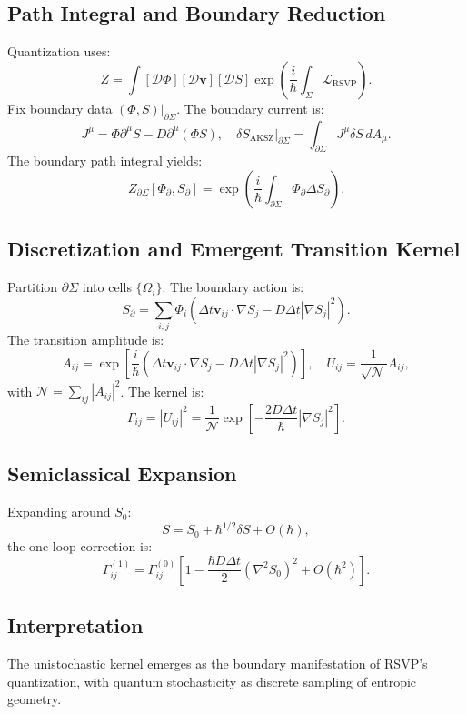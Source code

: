 \documentclass[12pt]{article}
\begin{document}
\subsection{Path Integral and Boundary Reduction}

Quantization uses:
\[
Z = \int [\mathcal{D}\Phi][\mathcal{D}\mathbf{v}][\mathcal{D}S] \exp\left( \frac{i}{\hbar} \int_\Sigma \mathcal{L}_{\mathrm{RSVP}} \right).
\]
Fix boundary data \((\Phi, S)|_{\partial \Sigma}\). The boundary current is:
\[
J^\mu = \Phi \partial^\mu S - D \partial^\mu (\Phi S), \quad \delta S_{\mathrm{AKSZ}}|_{\partial \Sigma} = \int_{\partial \Sigma} J^\mu \delta S \, dA_\mu.
\]
The boundary path integral yields:
\[
Z_{\partial \Sigma}[\Phi_{\partial}, S_{\partial}] = \exp\left( \frac{i}{\hbar} \int_{\partial \Sigma} \Phi_{\partial} \Delta S_{\partial} \right).
\]

\subsection{Discretization and Emergent Transition Kernel}

Partition \(\partial \Sigma\) into cells \(\{\Omega_i\}\). The boundary action is:
\[
S_{\partial} = \sum_{i,j} \Phi_i \left( \Delta t \mathbf{v}_{ij} \cdot \nabla S_j - D \Delta t |\nabla S_j|^2 \right).
\]
The transition amplitude is:
\[
A_{ij} = \exp\left[ \frac{i}{\hbar} \left( \Delta t \mathbf{v}_{ij} \cdot \nabla S_j - D \Delta t |\nabla S_j|^2 \right) \right], \quad U_{ij} = \frac{1}{\sqrt{\mathcal{N}}} A_{ij},
\]
with \(\mathcal{N} = \sum_{ij} |A_{ij}|^2\). The kernel is:
\[
\Gamma_{ij} = |U_{ij}|^2 = \frac{1}{\mathcal{N}} \exp\left[ -\frac{2 D \Delta t}{\hbar} |\nabla S_j|^2 \right].
\]

\subsection{Semiclassical Expansion}

Expanding around \(S_0\):
\[
S = S_0 + \hbar^{1/2} \delta S + O(\hbar),
\]
the one-loop correction is:
\[
\Gamma_{ij}^{(1)} = \Gamma_{ij}^{(0)} \left[ 1 - \frac{\hbar D \Delta t}{2} (\nabla^2 S_0)^2 + O(\hbar^2) \right].
\]

\subsection{Interpretation}

The unistochastic kernel emerges as the boundary manifestation of RSVP’s quantization, with quantum stochasticity as discrete sampling of entropic geometry.
\end{document}
